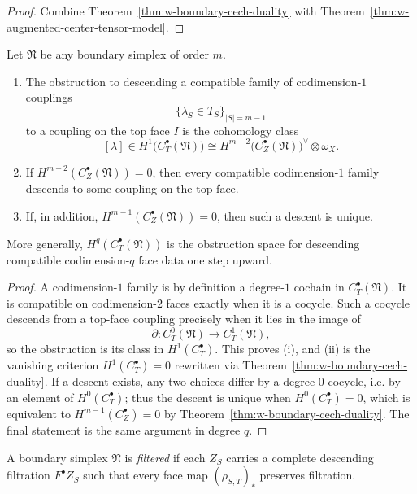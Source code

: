 \begin{proof}
Combine Theorem~\ref{thm:w-boundary-cech-duality} with
Theorem~\ref{thm:w-augmented-center-tensor-model}.
\end{proof}

\begin{theorem}
\label{thm:w-higher-mayer-vietoris-couplings}
Let $\mathfrak N$ be any boundary simplex of order $m$.
\begin{enumerate}[label=(\roman*)]
\item The obstruction to descending a compatible family of codimension-$1$ couplings
\[
\{\lambda_S\in T_S\}_{|S|=m-1}
\]
to a coupling on the top face $I$ is the cohomology class
\[
[\lambda]\in H^1\bigl(C_T^\bullet(\mathfrak N)\bigr)
\cong
H^{m-2}\bigl(C_Z^\bullet(\mathfrak N)\bigr)^\vee\otimes \omega_X.
\]
\item If $H^{m-2}(C_Z^\bullet(\mathfrak N))=0$, then every compatible codimension-$1$ family descends to
some coupling on the top face.
\item If, in addition, $H^{m-1}(C_Z^\bullet(\mathfrak N))=0$, then such a descent is unique.
\end{enumerate}
More generally, $H^q(C_T^\bullet(\mathfrak N))$ is the obstruction space for descending compatible
codimension-$q$ face data one step upward.
\end{theorem}

\begin{proof}
A codimension-$1$ family is by definition a degree-$1$ cochain in $C_T^\bullet(\mathfrak N)$. It is
compatible on codimension-$2$ faces exactly when it is a cocycle. Such a cocycle descends from a top-face
coupling precisely when it lies in the image of
\[
\partial\colon C_T^0(\mathfrak N)\to C_T^1(\mathfrak N),
\]
so the obstruction is its class in $H^1(C_T^\bullet)$. This proves (i), and (ii) is the vanishing criterion
$H^1(C_T^\bullet)=0$ rewritten via Theorem~\ref{thm:w-boundary-cech-duality}. If a descent exists, any two
choices differ by a degree-$0$ cocycle, i.e. by an element of $H^0(C_T^\bullet)$; thus the descent is unique
when $H^0(C_T^\bullet)=0$, which is equivalent to $H^{m-1}(C_Z^\bullet)=0$ by Theorem~\ref{thm:w-boundary-cech-duality}.
The final statement is the same argument in degree $q$.
\end{proof}

\begin{definition}
\label{def:w-filtered-boundary-simplex}
A boundary simplex $\mathfrak N$ is \emph{filtered} if each $Z_S$ carries a complete descending filtration
$F^\bullet Z_S$ such that every face map $(\rho_{S,T})_*$ preserves filtration.
\end{definition}

